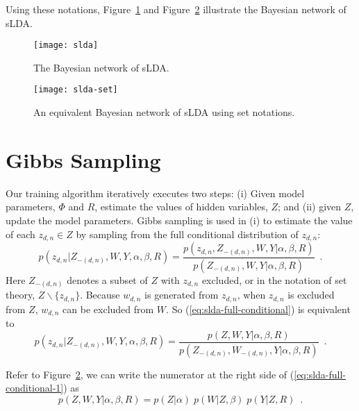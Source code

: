 Using these notations, Figure~\ref{fig:slda} and
Figure~\ref{fig:slda-set} illustrate the Bayesian network of sLDA.

\begin{figure}[!t]
  \centering
  \texttt{[image: slda]}
  \caption{The Bayesian network of sLDA.}
  \label{fig:slda}
\end{figure}

\begin{figure}[!t]
  \centering
  \texttt{[image: slda-set]}
  \caption{An equivalent Bayesian network of sLDA using set notations.}
  \label{fig:slda-set}
\end{figure}

\section{Gibbs Sampling}

Our training algorithm iteratively executes two steps: (i) Given model
parameters, $\Phi$ and $R$, estimate the values of hidden variables,
$Z$; and (ii) given $Z$, update the model parameters.  Gibbs sampling
is used in (i) to estimate the value of each $z_{d,n}\in{}Z$ by
sampling from the full conditional distribution of $z_{d,n}$:
\begin{equation}
  \label{eq:slda-full-conditional}
  p(z_{d,n}|Z_{-(d,n)},W,Y,\alpha,\beta,R)
  =
  \frac{
    p(z_{d,n},Z_{-(d,n)},W,Y|\alpha,\beta,R)
  }{
    p(Z_{-(d,n)},W,Y|\alpha,\beta,R)
  }
  \enspace.
\end{equation}
Here $Z_{-(d,n)}$ denotes a subset of $Z$ with $z_{d,n}$ excluded, or
in the notation of set theory, $Z\backslash\{z_{d,n}\}$.  Because
$w_{d,n}$ is generated from $z_{d,n}$, when $z_{d,n}$ is excluded from
$Z$, $w_{d,n}$ can be excluded from $W$.  So
(\ref{eq:slda-full-conditional}) is equivalent to
\begin{equation}
  \label{eq:slda-full-conditional-1}
  p(z_{d,n}|Z_{-(d,n)},W,Y,\alpha,\beta,R)
  =
  \frac{
    p(Z,W,Y|\alpha,\beta,R)
  }{
    p(Z_{-(d,n)},W_{-(d,n)},Y|\alpha,\beta,R)
  }
  \enspace.
\end{equation}

Refer to Figure~\ref{fig:slda-set}, we can write the numerator at the
right side of (\ref{eq:slda-full-conditional-1}) as
\begin{equation}
  \label{eq:slda-joint-distribution}
  p(Z,W,Y|\alpha,\beta,R) =
  p(Z|\alpha) \; p(W|Z,\beta) \; p(Y|Z,R)
  \enspace.
\end{equation}

